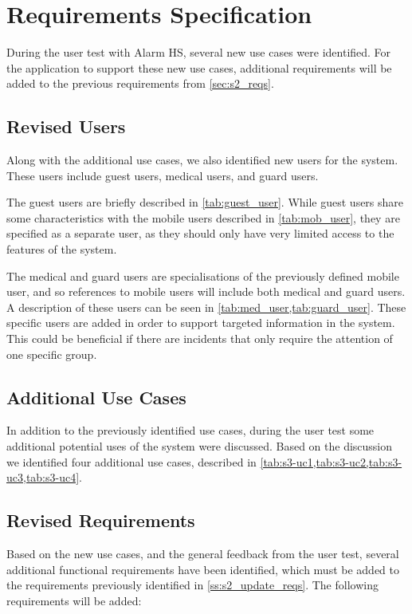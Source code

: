 \section{Requirements Specification} \label{sec:s3_requirements}
During the user test with Alarm HS, several new use cases were identified. For the application to support these new use cases, additional requirements will be added to the previous requirements from \cref{sec:s2_reqs}.

\subsection{Revised Users} \label{ss:s3_users}
Along with the additional use cases, we also identified new users for the system. These users include guest users, medical users, and guard users.

The guest users are briefly described in \cref{tab:guest_user}. While guest users share some characteristics with the mobile users described in \cref{tab:mob_user}, they are specified as a separate user, as they should only have very limited access to the features of the system.

The medical and guard users are specialisations of the previously defined mobile user, and so references to mobile users will include both medical and guard users. A description of these users can be seen in \cref{tab:med_user,tab:guard_user}. These specific users are added in order to support targeted information in the system. This could be beneficial if there are incidents that only require the attention of one specific group.



\subsection{Additional Use Cases \label{ss:s3_uc}}
In addition to the previously identified use cases, during the user test some additional potential uses of the system were discussed. Based on the discussion we identified four additional use cases, described in \cref{tab:s3-uc1,tab:s3-uc2,tab:s3-uc3,tab:s3-uc4}.



\subsection{Revised Requirements} \label{ss:s2_reqs}
Based on the new use cases, and the general feedback from the user test, several additional functional requirements have been identified, which must be added to the requirements previously identified in \cref{ss:s2_update_reqs}. The following requirements will be added:

